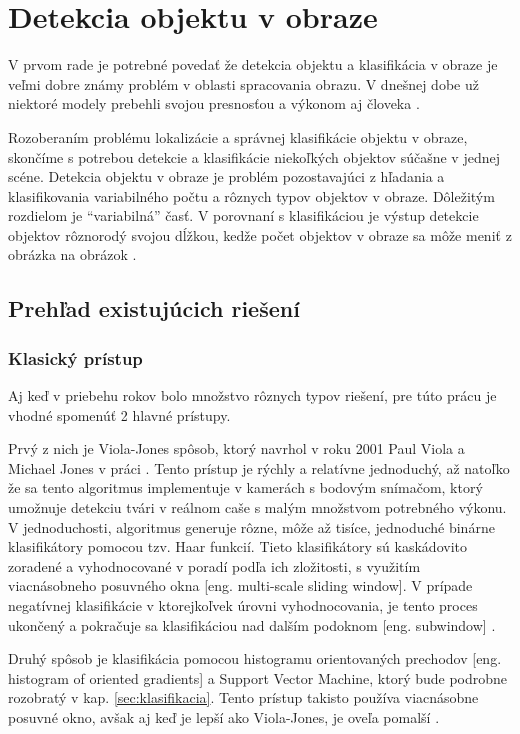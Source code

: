 
\section{Detekcia objektu v obraze}
\label{sec:detekcia}

V prvom rade je potrebné povedať že detekcia objektu a klasifikácia v obraze je veľmi dobre známy problém v oblasti spracovania obrazu.
V dnešnej dobe už niektoré modely prebehli svojou presnosťou a výkonom aj človeka \cite{prop:NNvsHuman}.

Rozoberaním problému lokalizácie a správnej klasifikácie objektu v obraze, skončíme s potrebou
    detekcie a klasifikácie niekoľkých objektov súčašne v jednej scéne.
Detekcia objektu v obraze je problém pozostavajúci z hľadania a klasifikovania variabilného počtu a rôznych typov objektov v obraze.
Dôležitým rozdielom je ``variabilná'' časť. V porovnaní s klasifikáciou je výstup detekcie objektov rôznorodý svojou dĺžkou, kedže
    počet objektov v obraze sa môže meniť z obrázka na obrázok \cite{odkaz:ObjectDetectionOverview}.

\subsection{Prehľad existujúcich riešení}

\subsubsection{Klasický prístup}
Aj keď v priebehu rokov bolo množstvo rôznych typov riešení, pre túto prácu je vhodné spomenúť 2 hlavné prístupy.

Prvý z nich je Viola-Jones spôsob, ktorý navrhol v roku 2001 Paul Viola a Michael Jones v práci \cite{prop:Viola2001RobustRF}.
Tento prístup je rýchly a relatívne jednoduchý, až natoľko že sa tento algoritmus implementuje v kamerách s bodovým snímačom, ktorý umožnuje
    detekciu tvári v reálnom caše s malým množstvom potrebného výkonu.
V jednoduchosti, algoritmus generuje rôzne, môže až tisíce, jednoduché binárne klasifikátory pomocou tzv. Haar funkcií.
Tieto klasifikátory sú kaskádovito zoradené a vyhodnocované v poradí podľa ich zložitosti, s využitím viacnásobneho posuvného okna [eng. multi-scale sliding window].
V prípade negatívnej klasifikácie v ktorejkoľvek úrovni vyhodnocovania, je tento proces ukončený a pokračuje sa klasifikáciou nad dalším podoknom [eng. subwindow] \cite{prop:Viola2001RobustRF}.

Druhý spôsob je klasifikácia pomocou histogramu orientovaných prechodov [eng. histogram of oriented gradients] a Support Vector Machine, ktorý bude podrobne
    rozobratý v kap. \ref{sec:klasifikacia}. Tento prístup takisto používa viacnásobne posuvné okno, avšak aj keď je lepší ako Viola-Jones, je oveľa pomalší \cite{odkaz:ObjectDetectionOverview}.

